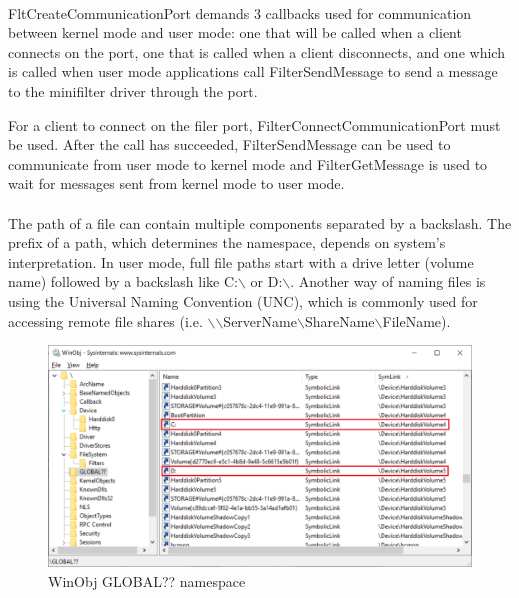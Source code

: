 		\paragraph{}
		FltCreateCommunicationPort demands 3 callbacks used for communication between kernel mode and user mode: one that will be called when a client connects on the port, one that is called when a client disconnects, and one which is called when user mode applications call FilterSendMessage to send a message to the minifilter driver through the port. \cite{MSDNCommunication}
		

		For a client to connect on the filer port, FilterConnectCommunicationPort must be used. After the call has succeeded, FilterSendMessage can be used to communicate from user mode to kernel mode and FilterGetMessage is used to wait for messages sent from kernel mode to user mode.\cite{MSDNCommunication}
		
		
		\paragraph{}
		The path of a file can contain multiple components separated by a backslash. The prefix of a path, which determines the namespace, depends on system's interpretation. In user mode, full file paths start with a drive letter (volume name) followed by a backslash like C:$\backslash$ or D:$\backslash$. Another way of naming files is using the Universal Naming Convention (UNC), which is commonly used for accessing remote file shares (i.e. $\backslash$$\backslash$ServerName$\backslash$ShareName$\backslash$FileName).
		
		\begin{figure}[h!]
			\begin{center}
				\includegraphics[scale=0.6]{images/WinObj.jpg}
				\caption{WinObj GLOBAL?? namespace}
				\label{fig:WinObj}
			\end{center}
		\end{figure}
		
